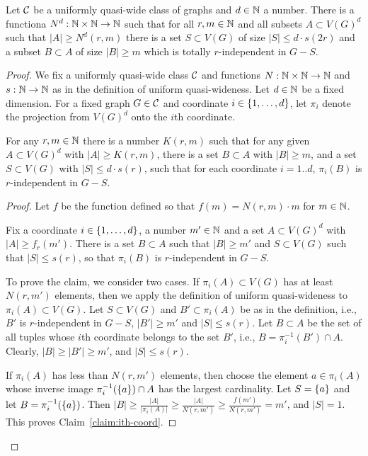 \begin{proposition}\label{prop:uqw-tuples}
	Let $\cal C$ be a uniformly quasi-wide class of graphs and $d\in\N$ a number.
	There is a  functiona $N^d:\N\times\N\to\N$ 
	such that for all $r,m\in\N$ and all subsets $A\subset V(G)^d$
	such that $|A|\ge N^d(r,m)$ there  is a set $S\subset V(G)$
	of size $|S|\le d\cdot s(2 r)$ and a subset $B\subset A$ of size $|B|\ge m$ which is totally $r$-independent in $G-S$.
\end{proposition}
\begin{proof}We fix a uniformly quasi-wide class $\cal C$ and functions $N:\N\times\N\to \N$
	and $s:\N\to\N$ as in the definition of uniform quasi-wideness.
	Let $d\in \N$ be a fixed dimension.
		For a fixed graph $G\in \cal C$  and
	  coordinate $i\in\set{1,\ldots,d}$, let $\pi_i$ denote the projection from $V(G)^d$ onto the $i$th coordinate.

	


\begin{lemma}\label{lem:step1} For any $r,m\in \N$ there is a number $K(r,m)$ such that
	for any given $A\subset V(G)^d$ with $|A|\ge K(r,m)$,
	there is a set $B\subset A$ with $|B|\ge m$, and a set $S\subset V(G)$ with $|S|\le d\cdot s(r)$, 
	such that for each coordinate $i=1..d$, 
 $\pi_i(B)$ is $r$-independent in $G-S$. 
\end{lemma}
\begin{proof}

Let $f$ be the function defined so that $f(m)=N(r,m)\cdot m$ for $m\in\N$.

\begin{claim}\label{claim:ith-coord}
Fix a coordinate $i\in\set{1,\ldots,d}$, a number $m'\in\N$ and a  set $A\subset V(G)^d$ with  $|A|\ge f_r(m')$.
There is a set $B\subset A$ such that $|B|\ge m'$
and $S\subset V(G)$ such that $|S|\le  s(r)$,
so that  $\pi_i(B)$ is $r$-independent in $G-S$.	
\end{claim}
To prove the claim, 
we consider two cases.
If $\pi_i(A)\subset V(G)$ has at least $N(r,m')$ elements, then we apply the definition of uniform quasi-wideness to $\pi_i(A)\subset V(G)$. Let $S\subset V(G)$ and $B'\subset \pi_i(A)$
be as in the definition, i.e., $B'$ is $r$-independent in $G-S$,
$|B'|\ge m'$ and $|S|\le s(r)$. Let $B\subset A$ be the set of all tuples 
whose $i$th coordinate belongs to the set $B'$, i.e., $B=\pi_i^{-1}(B')\cap A$.
Clearly, $|B|\ge |B'|\ge m'$, and $|S|\le s(r)$.

If $\pi_i(A)$ has less than $N(r,m')$ elements, then choose the element $a\in\pi_i(A)$ whose inverse image $\pi_i^{-1}(\set a)\cap A$ has the largest cardinality. Let $S=\set{a}$ 
and let $B=\pi_i^{-1}(\set a)$. Then $|B|\ge \frac{|A|}{|\pi_i(A)|}\ge \frac{|A|}{N(r,m')}\ge \frac {f(m')}{N(r,m')}=m'$,
and $|S|=1$. This proves Claim~\ref{claim:ith-coord}.



\end{proof}
\end{proof}

